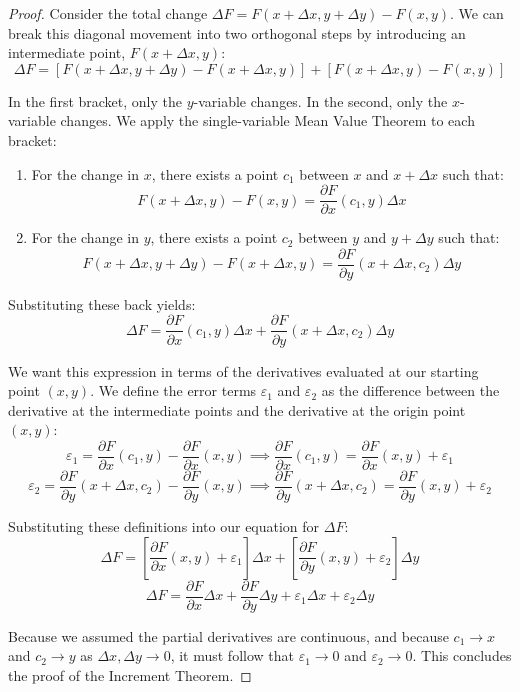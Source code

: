 \documentclass{essay}
\begin{document}
\begin{proof}
  Consider the total change \(\Delta F = F(x+\Delta x, y+\Delta y) - F(x,y)\). We can break this diagonal movement into two orthogonal steps by introducing an intermediate point, \(F(x+\Delta x, y)\):
  \[ \Delta F = [F(x+\Delta x, y+\Delta y) - F(x+\Delta x, y)] + [F(x+\Delta x, y) - F(x,y)] \]

  In the first bracket, only the \(y\)-variable changes. In the second, only the \(x\)-variable changes. We apply the single-variable Mean Value Theorem to each bracket:
  \begin{enumerate}
    \item For the change in \(x\), there exists a point \(c_{1}\) between \(x\) and \(x+\Delta x\) such that:
      \[ F(x+\Delta x, y) - F(x,y) = \frac{\partial F}{\partial x}(c_{1}, y) \Delta x \]
    \item For the change in \(y\), there exists a point \(c_{2}\) between \(y\) and \(y+\Delta y\) such that:
      \[ F(x+\Delta x, y+\Delta y) - F(x+\Delta x, y) = \frac{\partial F}{\partial y}(x+\Delta x, c_{2}) \Delta y \]
  \end{enumerate}

  Substituting these back yields:
  \[ \Delta F = \frac{\partial F}{\partial x}(c_{1}, y) \Delta x + \frac{\partial F}{\partial y}(x+\Delta x, c_{2}) \Delta y \]

  We want this expression in terms of the derivatives evaluated at our starting point \((x,y)\). We define the error terms \(\varepsilon_{1}\) and \(\varepsilon_{2}\) as the difference between the derivative at the intermediate points and the derivative at the origin point \((x,y)\):
  \[ \varepsilon_{1} = \frac{\partial F}{\partial x}(c_{1}, y) - \frac{\partial F}{\partial x}(x, y) \implies \frac{\partial F}{\partial x}(c_{1}, y) = \frac{\partial F}{\partial x}(x, y) + \varepsilon_{1} \]
  \[ \varepsilon_{2} = \frac{\partial F}{\partial y}(x+\Delta x, c_{2}) - \frac{\partial F}{\partial y}(x, y) \implies \frac{\partial F}{\partial y}(x+\Delta x, c_{2}) = \frac{\partial F}{\partial y}(x, y) + \varepsilon_{2} \]

  Substituting these definitions into our equation for \(\Delta F\):
  \[ \Delta F = \left[ \frac{\partial F}{\partial x}(x, y) + \varepsilon_{1} \right] \Delta x + \left[ \frac{\partial F}{\partial y}(x, y) + \varepsilon_{2} \right] \Delta y \]
  \[ \Delta F = \frac{\partial F}{\partial x}\Delta x + \frac{\partial F}{\partial y}\Delta y + \varepsilon_{1} \Delta x + \varepsilon_{2} \Delta y \]

  Because we assumed the partial derivatives are continuous, and because \(c_{1} \to x\) and \(c_{2} \to y\) as \(\Delta x, \Delta y \to 0\), it must follow that \(\varepsilon_{1} \to 0\) and \(\varepsilon_{2} \to 0\). This concludes the proof of the Increment Theorem.
\end{proof}
\end{document}
